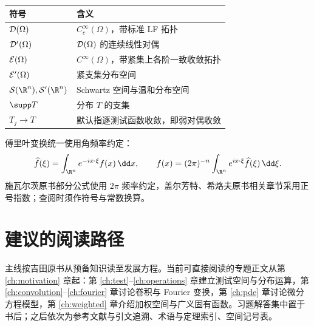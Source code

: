 \begin{center}
\begin{tabular}{ll}
\toprule
符号 & 含义\\\midrule
$\mathcal{D}(\Omega)$ & $C_c^\infty(\Omega)$，带标准 LF 拓扑\\
$\mathcal{D}'(\Omega)$ & $\mathcal{D}(\Omega)$ 的连续线性对偶\\
$\mathcal{E}(\Omega)$ & $C^\infty(\Omega)$，带紧集上各阶一致收敛拓扑\\
$\mathcal{E}'(\Omega)$ & 紧支集分布空间\\
$\Sch(\R^n),\Temp(\R^n)$ & Schwartz 空间与温和分布空间\\
$\supp T$ & 分布 $T$ 的支集\\
$T_j\to T$ & 默认指逐测试函数收敛，即弱对偶收敛\\
\bottomrule
\end{tabular}
\end{center}

傅里叶变换统一使用角频率约定：
\begin{equation}\label{eq:fourier-convention}
 \widehat f(\xi)=\int_{\R^n}e^{-ix\cdot\xi}f(x)\,\dd x,
 \qquad f(x)=(2\pi)^{-n}\int_{\R^n}e^{ix\cdot\xi}\widehat f(\xi)\,\dd\xi.
\end{equation}
施瓦尔茨原书部分公式使用 $2\pi$ 频率约定，盖尔芳特、希烙夫原书相关章节采用正号指数；查阅时须作符号与常数换算。

\section*{建议的阅读路径}
主线按吉田原书从预备知识读至发展方程。当前可直接阅读的专题正文从第 \ref{ch:motivation} 章起：第 \ref{ch:test}--\ref{ch:operations} 章建立测试空间与分布运算，第 \ref{ch:convolution}--\ref{ch:fourier} 章讨论卷积与 Fourier 变换，第 \ref{ch:pde} 章讨论微分方程模型，第 \ref{ch:weighted} 章介绍加权空间与广义固有函数。习题解答集中置于书后；之后依次为参考文献与引文追溯、术语与定理索引、空间记号表。
